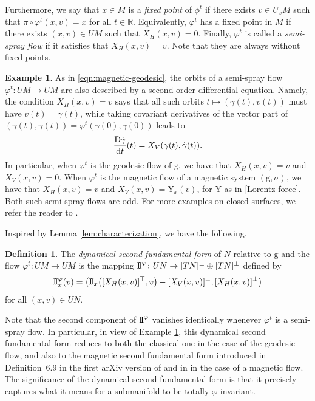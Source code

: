 \documentclass[pdftex]{sigma}
\newcommand{\g}{\mathrm{g}}
\newcommand{\Y}{\mathrm{Y}}
\numberwithin{equation}{section}
\theoremstyle{definition}
\newtheorem{Definition}[Theorem]{Definition}
\newtheorem{Example}[Theorem]{Example}
\begin{document}
Furthermore, we say that $x\in M$ is a \emph{fixed point} of $\phi^t$ if there exists $v \in U_xM$ such that $\pi \circ \varphi^t(x,v) = x$ for all $t \in \mathbb{R}$. Equivalently, $\varphi^t$ has a fixed point in $M$ if there exists $(x,v) \in UM$ such that $X_H(x,v) = 0$. Finally, $\varphi^t$ is called a \emph{semi-spray flow} if it satisfies that $X_H(x,v) = v$. Note that they are always without fixed points.

\begin{Example}\label{example:odd-flows}
 As in \eqref{eqn:magnetic-geodesic}, the orbits of a semi-spray flow \mbox{$\varphi^t \colon UM\to UM$} are also described by a second-order differential equation. Namely, the condition $X_H(x,v) = v$ says that all such orbits $t\mapsto (\gamma(t),v(t))$ must have $v(t) = \dot{\gamma}(t)$, while taking covariant derivatives of the vector part of $(\gamma(t),\dot{\gamma}(t)) = \varphi^t(\gamma(0),\dot{\gamma}(0))$ leads to
 \begin{equation}\label{Dc'/dt=XV}
 \frac{{\rm D}\dot{\gamma}}{{\rm d}t}(t)= X_V(\gamma(t),\dot{\gamma}(t)).
 \end{equation}
 In particular, when $\varphi^t$ is the geodesic flow of $\g$, we have that $X_H(x,v)=v$ and \mbox{$X_V(x,v)=0$}. When $\varphi^t$ is the magnetic flow of a magnetic system $(\g,\sigma)$, we have that $X_H(x,v)=v$ and \mbox{$X_V(x,v)=\Y_x(v)$}, for $\Y$ as in \eqref{Lorentz-force}. Both such semi-spray flows are odd. For more examples on closed surfaces, we refer the reader to \cite{cuesta2025thermostats}.
\end{Example}

Inspired by Lemma \ref{lem:characterization}, we have the following.

\begin{Definition}\label{dyn-2FF}
 The \emph{dynamical second fundamental form} of $N$ relative to $\g$ and the flow $\varphi^t\colon UM\to UM$ is the mapping ${\rm I\!I}^{\varphi}\colon UN\to [TN]^\perp \oplus [TN]^\perp$ defined by \[{\rm I\!I }^{\varphi}_x(v) = \bigl({\rm I\!I}_x\bigl([X_H(x,v)]^\top, v\bigr) - [X_V(x,v)]^\perp,
 [X_H(x,v)]^\perp\bigr)\] for all $(x,v)\in UN$.
\end{Definition}

Note that the second component of ${\rm I\!I}^\varphi$ vanishes identically whenever $\varphi^t$ is a semi-spray flow. In particular, in view of Example \ref{example:odd-flows}, this dynamical second fundamental form reduces to both the classical one in the case of the geodesic flow, and also to the magnetic second fundamental form introduced in Definition~6.9 in the first arXiv version of \cite{ABM_2025} and in \cite[Definition 4.1]{terek2025submanifold} in the case of a magnetic flow. The significance of the dynamical second fundamental form is that it precisely captures what it means for a submanifold to be totally $\varphi$-invariant.
\end{document}
